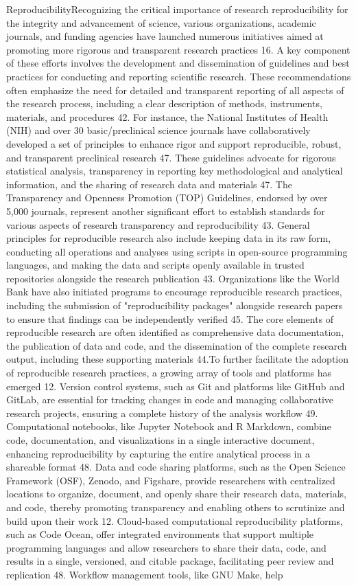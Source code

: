 \documentclass{article}
\begin{document}
ReproducibilityRecognizing the critical importance of research reproducibility for the integrity and advancement of science, various organizations, academic journals, and funding agencies have launched numerous initiatives aimed at promoting more rigorous and transparent research practices 16. A key component of these efforts involves the development and dissemination of guidelines and best practices for conducting and reporting scientific research. These recommendations often emphasize the need for detailed and transparent reporting of all aspects of the research process, including a clear description of methods, instruments, materials, and procedures 42. For instance, the National Institutes of Health (NIH) and over 30 basic/preclinical science journals have collaboratively developed a set of principles to enhance rigor and support reproducible, robust, and transparent preclinical research 47. These guidelines advocate for rigorous statistical analysis, transparency in reporting key methodological and analytical information, and the sharing of research data and materials 47. The Transparency and Openness Promotion (TOP) Guidelines, endorsed by over 5,000 journals, represent another significant effort to establish standards for various aspects of research transparency and reproducibility 43. General principles for reproducible research also include keeping data in its raw form, conducting all operations and analyses using scripts in open-source programming languages, and making the data and scripts openly available in trusted repositories alongside the research publication 43. Organizations like the World Bank have also initiated programs to encourage reproducible research practices, including the submission of "reproducibility packages" alongside research papers to ensure that findings can be independently verified 45. The core elements of reproducible research are often identified as comprehensive data documentation, the publication of data and code, and the dissemination of the complete research output, including these supporting materials 44.To further facilitate the adoption of reproducible research practices, a growing array of tools and platforms has emerged 12. Version control systems, such as Git and platforms like GitHub and GitLab, are essential for tracking changes in code and managing collaborative research projects, ensuring a complete history of the analysis workflow 49. Computational notebooks, like Jupyter Notebook and R Markdown, combine code, documentation, and visualizations in a single interactive document, enhancing reproducibility by capturing the entire analytical process in a shareable format 48. Data and code sharing platforms, such as the Open Science Framework (OSF), Zenodo, and Figshare, provide researchers with centralized locations to organize, document, and openly share their research data, materials, and code, thereby promoting transparency and enabling others to scrutinize and build upon their work 12. Cloud-based computational reproducibility platforms, such as Code Ocean, offer integrated environments that support multiple programming languages and allow researchers to share their data, code, and results in a single, versioned, and citable package, facilitating peer review and replication 48. Workflow management tools, like GNU Make, help 
\end{document}
